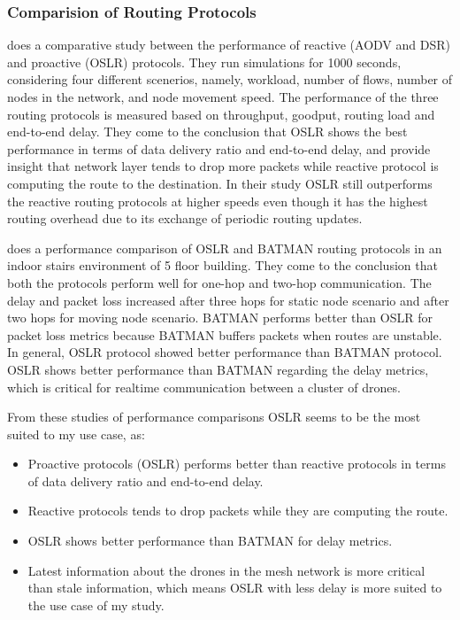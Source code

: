 \subsubsection{Comparision of Routing Protocols}

 does a comparative study between the performance of reactive (AODV and DSR) and proactive (OSLR) protocols. They run simulations for 1000 seconds, considering four different scenerios, namely, workload, number of flows, number of nodes in the network, and node movement speed. The performance of the three routing protocols is measured based on throughput, goodput, routing load and end-to-end delay. They come to the conclusion that OSLR shows the best performance in terms of data delivery ratio and end-to-end delay, and provide insight that network layer tends to drop more packets while reactive protocol is computing the route to the destination. In their study OSLR still outperforms the reactive routing protocols at higher speeds even though it has the highest routing overhead due to its exchange of periodic routing updates.

 does a performance comparison of OSLR and BATMAN routing protocols in an indoor stairs environment of 5 floor building. They come to the conclusion that both the protocols perform well for one-hop and two-hop communication. The delay and packet loss increased after three hops for static node scenario and after two hops for moving node scenario. BATMAN performs better than OSLR for packet loss metrics because BATMAN buffers packets when routes are unstable. In general, OSLR protocol showed better performance than BATMAN protocol. OSLR shows better performance than BATMAN regarding the delay metrics, which is critical for realtime communication between a cluster of drones.

From these studies of performance comparisons OSLR seems to be the most suited to my use case, as:
\begin{itemize}
	\item Proactive protocols (OSLR) performs better than reactive protocols in terms of data delivery ratio and end-to-end delay.
	\item Reactive protocols tends to drop packets while they are computing the route.
	\item OSLR shows better performance than BATMAN for delay metrics.
	\item Latest information about the drones in the mesh network is more critical than stale information, which means OSLR with less delay is more suited to the use case of my study.
\end{itemize}

